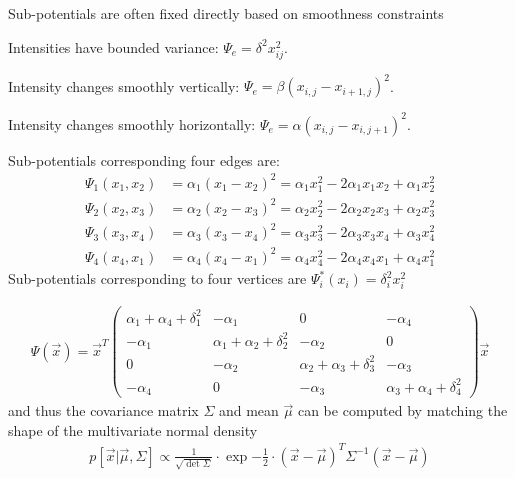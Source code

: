 \documentclass[landscape,footrule]{foils}
\begin{document}
Sub-potentials are often fixed directly based on smoothness constraints
\begin{triangles}
\item Intensities have bounded variance: $\Psi_e=\delta^2 x_{ij}^2$. 
\item Intensity changes smoothly vertically: $\Psi_e=\beta(x_{i,j}-x_{i+1,j})^2$.
\item Intensity changes smoothly horizontally: $\Psi_e=\alpha(x_{i,j}-x_{i,j+1})^2$.
\end{triangles} 


\vspace*{-0.6cm}

Sub-potentials corresponding four edges are:  
\begin{align*}
\Psi_1(x_1,x_2)&= \alpha_1(x_{1}-x_2)^2=\alpha_1 x_1^2-2\alpha_1 x_1x_2+\alpha_1 x_2^2\\
\Psi_2(x_2,x_3)&= \alpha_2(x_{2}-x_3)^2=\alpha_2 x_2^2-2\alpha_2 x_2x_3+\alpha_2 x_3^2\\
\Psi_3(x_3,x_4)&= \alpha_3(x_{3}-x_4)^2=\alpha_3 x_3^2-2\alpha_3 x_3x_4+\alpha_3 x_4^2\\
\Psi_4(x_4,x_1)&= \alpha_4(x_{4}-x_1)^2=\alpha_4 x_4^2-2\alpha_4 x_4x_1+\alpha_4 x_1^2
\end{align*}
Sub-potentials corresponding to four vertices are $\Psi_i^*(x_i)=\delta_i^2 x_i^2$ 


\begin{align*}
\Psi(\vec{x})=\vec{x}^T
\begin{pmatrix}
\alpha_1+\alpha_4+\delta_1^2 & -\alpha_1 & 0 & -\alpha_4\\
-\alpha_1 &\alpha_1+\alpha_2+\delta_2^2 & -\alpha_2 & 0 \\
0 &-\alpha_2 &\alpha_2+\alpha_3+\delta_3^2 & -\alpha_3 \\
-\alpha_4 & 0 &-\alpha_3 &\alpha_3+\alpha_4+\delta_4^2 
\end{pmatrix}
\vec{x}
\end{align*}
and thus the covariance matrix $\Sigma$ and mean $\vec{\mu}$ can be computed by matching the shape of the multivariate normal density
\begin{align*}
p[\vec{x}|\vec{\mu},\Sigma]\propto\frac{1}{\sqrt{\det\Sigma}}\cdot\exp{-\frac{1}{2}\cdot 
(\vec{x}-\vec{\mu})^T\Sigma^{-1}(\vec{x}-\vec{\mu})}
\end{align*}
\end{document}
